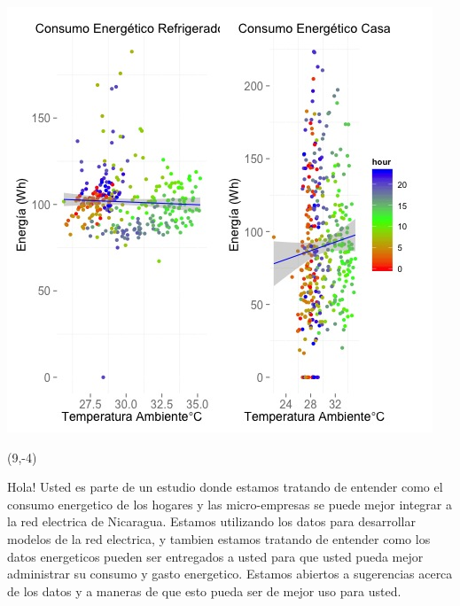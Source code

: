 \documentclass{article}\usepackage[]{graphicx}\usepackage[]{color}
\newenvironment{knitrout}{}{} %
\begin{document}
\begin{knitrout}
\color{fgcolor}
\includegraphics[scale=0.75]{figure/A9_correlaciones} 
\end{knitrout}

 \begin{textblock}{1}(9,-4)
\begin{minipage}{20em}
\begingroup

\endgroup
\end{minipage}
\end{textblock}

\vspace{70px}
\begin{knitrout}
Hola! Usted es parte de un estudio donde estamos tratando de entender como el consumo energetico de los hogares y las micro-empresas se puede mejor integrar a la red electrica de Nicaragua. Estamos utilizando los datos para desarrollar modelos de la red electrica, y tambien estamos tratando de entender como los datos energeticos pueden ser entregados a usted para que usted pueda mejor administrar su consumo y gasto energetico.  Estamos abiertos a sugerencias acerca de los datos y a maneras de que esto pueda ser de mejor uso para usted.
\end{knitrout}
\end{document}
